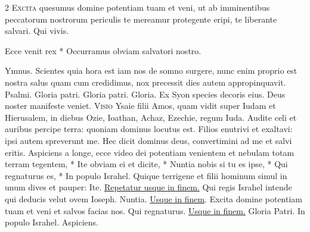 \begin{multicols*}{2}
\lettrine[lines=2]{\zallmancaps \color{Blue} E}{xcita} quesumus domine potentiam tuam et veni, ut ab imminentibus peccatorum nostrorum periculis te mereamur protegente eripi, te liberante salvari. Qui vivis.
\begin{invitatory}
{Ecce venit rex * Occurramus obviam salvatori nostro.}
\end{invitatory}
{\color{Red} Ymnus.}
{}
 Scientes quia hora est iam nos de somno surgere, nunc enim proprio est nostra salus quam cum credidimus, nox precessit dies autem appropinquavit. {\color{Red} Psalmi.}
Gloria patri. 
Gloria patri. 
Gloria. \V Ex Syon species decoris eius. \R Deus noster manifeste veniet.
\lettrine[lines=2]{\zallmancaps \color{Blue} V}{isio} Ysaie filii Amos, quam vidit super Iudam et Hierusalem, in diebus Ozie, Ioathan, Achaz, Ezechie, regum Iuda. Audite celi et auribus percipe terra: quoniam dominus locutus est. Filios enutrivi et exaltavi: ipsi autem spreverunt me. Hec dicit dominus deus, convertimini ad me et salvi eritis.
\hypertarget{aspiciens}{\label{aspiciens}}
\newline \R Aspiciens a longe, ecce video dei potentiam venientem et nebulam totam terram tegentem, * Ite obviam ei et dicite, * Nuntia nobis si tu es ipse, * Qui regnaturus es, * In populo Israhel. \V Quique terrigene et filii hominum simul in unum dives et pauper: Ite. \ul{Repetatur usque in finem.} \V Qui regis Israhel intende qui deducis velut ovem Ioseph. Nuntia. \ul{Usque in finem}. \V Excita domine potentiam tuam et veni et salvos facias nos. Qui regnaturus. \ul{Usque in finem.} Gloria Patri. In populo Israhel. \R Aspiciens.

\end{multicols*}
